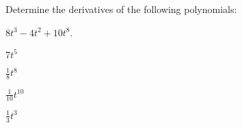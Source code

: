
\begin{problem}
\item Determine the derivatives of the following polynomials:
  \begin{subproblem}
    \item $8 t^3 - 4 t^2 + 10 t^8$.
      \vfill
    \item $7t^5$
      \vfill
    \item $\frac{1}{8} t^8$
      \vfill
    \item $\frac{1}{10} t^{10}$
      \vfill
    \item $\frac{1}{3} t^{3}$
      \vfill
  \end{subproblem}
\end{problem}


